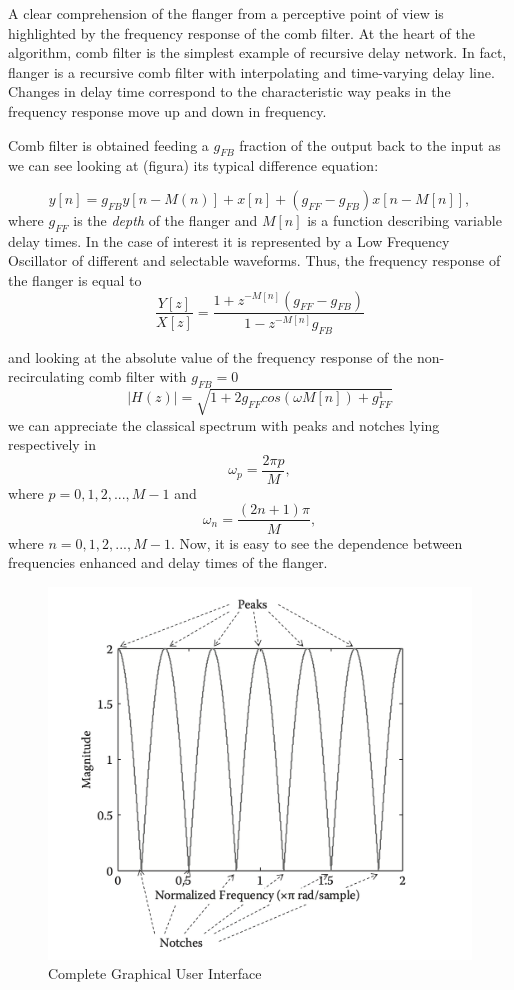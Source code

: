 A clear comprehension of the flanger from a perceptive point of view  is highlighted by the frequency response of the comb filter. 
At the heart of the algorithm, comb filter is the simplest example of recursive delay network.
In fact, flanger is a recursive comb filter with interpolating and time-varying delay line. Changes in delay time correspond to the characteristic way peaks in the frequency response move up and down in frequency\cite{puckette2006theory}.

Comb filter is obtained feeding a $g_{FB}$ fraction of the output back to the input as we can see looking at (figura) its typical difference equation:

\[
	y[n] = g_{FB} y[n - M(n)] + x[n] + (g_{FF} - g_{FB}) x[n - M[n]],
\]
where $g_{FF}$ is the \textit{depth} of the flanger and $M[n]$ is a function describing variable delay times. In the case of interest it is represented by a Low Frequency Oscillator of different and selectable waveforms. Thus, the frequency response of the flanger is equal to 
\[
       \frac{Y[z]}{X[z]} = \frac{1 + z^{-M[n]} (g_{FF} - g_{FB})} {1 - z^{-M[n]}  g_{FB} }
\]

and looking at the absolute value of the frequency response of the non-recirculating comb filter with $g_{FB} = 0$ 
\[
    |H(z)| = \sqrt{ 1 + 2g_{FF} cos(\omega M[n]) + g_{FF}^1}
\]
 we can appreciate the classical spectrum with peaks and notches lying respectively in 
\[
       \omega_p = \frac{2 \pi p}{M},
\]
where $p = 0, 1, 2, ..., M-1$ and 
\[
       \omega_n = \frac{(2n+1) \pi}{M},
\]
where $n = 0, 1, 2, ..., M-1$. Now, it is easy to see the dependence between frequencies enhanced and delay times of the flanger.

\begin{figure}
	\centering
	\includegraphics[width=0.5\linewidth]{assets/comb.png}
	\caption{Complete Graphical User Interface}
	\label{fig:gui-all}
\end{figure}



